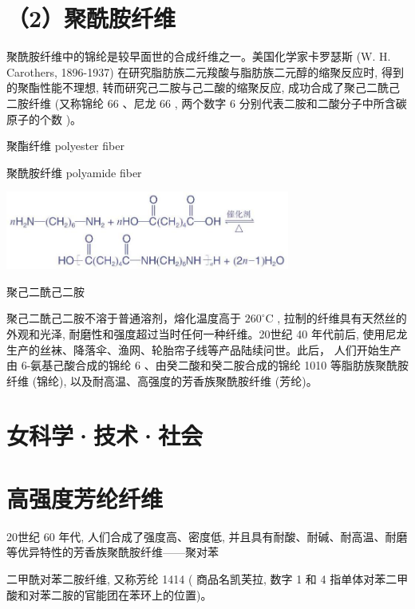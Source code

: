 \documentclass[10pt]{article}
\begin{document}
\section*{（2）聚酰胺纤维}

聚酰胺纤维中的锦纶是较早面世的合成纤维之一。美国化学家卡罗瑟斯 (W. H. Carothers, 1896-1937) 在研究脂肪族二元羧酸与脂肪族二元醇的缩聚反应时, 得到的聚酯性能不理想, 转而研究己二胺与己二酸的缩聚反应, 成功合成了聚己二酰己二胺纤维 (又称锦纶 66 、尼龙 66 , 两个数字 6 分别代表二胺和二酸分子中所含碳原子的个数 )。

\begin{mdframed}

聚酯纤维 polyester fiber

聚酰胺纤维 polyamide fiber

\end{mdframed}

\begin{center}
\includegraphics[max width=0.7\textwidth]{images/0190efc5-b58a-7c43-bfb0-e0a030df9cfd_148_981575.jpg}
\end{center}

聚己二酰己二胺

聚己二酰己二胺不溶于普通溶剂，熔化温度高于 \({260}^{ \circ }\mathrm{C}\) , 拉制的纤维具有天然丝的外观和光泽, 耐磨性和强度超过当时任何一种纤维。20世纪 40 年代前后, 使用尼龙生产的丝袜、降落伞、渔网、轮胎帘子线等产品陆续问世。此后， 人们开始生产由 6-氨基己酸合成的锦纶 6 、由癸二酸和癸二胺合成的锦纶 1010 等脂肪族聚酰胺纤维 (锦纶), 以及耐高温、高强度的芳香族聚酰胺纤维 (芳纶)。

\section*{女科学·技术·社会}

\section*{高强度芳纶纤维}

20世纪 60 年代, 人们合成了强度高、密度低, 并且具有耐酸、耐碱、耐高温、耐磨等优异特性的芳香族聚酰胺纤维——聚对苯

二甲酰对苯二胺纤维, 又称芳纶 1414 ( 商品名凯芙拉, 数字 1 和 4 指单体对苯二甲酸和对苯二胺的官能团在苯环上的位置)。
\end{document}
